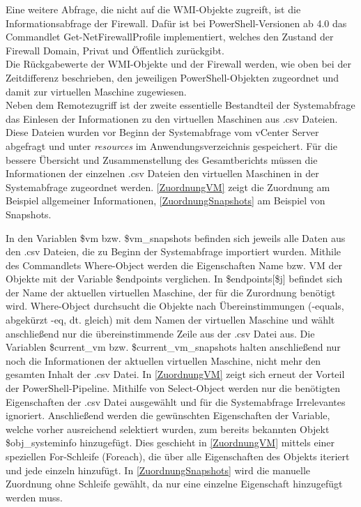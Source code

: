 Eine weitere Abfrage, die nicht auf die WMI-Objekte zugreift, ist die Informationsabfrage der Firewall. Dafür ist bei PowerShell-Versionen ab 4.0 das Commandlet Get-NetFirewallProfile implementiert, welches den Zustand der Firewall Domain, Privat und Öffentlich zurückgibt.\medskip\\
Die Rückgabewerte der WMI-Objekte und der Firewall werden, wie oben bei der Zeitdifferenz beschrieben, den jeweiligen PowerShell-Objekten zugeordnet und damit zur virtuellen Maschine zugewiesen.\medskip\\
Neben dem Remotezugriff ist der zweite essentielle Bestandteil der Systemabfrage das Einlesen der Informationen zu den virtuellen Maschinen aus .csv Dateien. Diese Dateien wurden vor Beginn der Systemabfrage vom vCenter Server abgefragt und unter \textit{resources} im Anwendungsverzeichnis gespeichert. Für die bessere Übersicht und Zusammenstellung des Gesamtberichts müssen die Informationen der einzelnen .csv Dateien den virtuellen Maschinen in der Systemabfrage zugeordnet werden. \autoref{ZuordnungVM} zeigt die Zuordnung am Beispiel allgemeiner Informationen, \autoref{ZuordnungSnapshots} am Beispiel von Snapshots.


In den Variablen \$vm bzw. \$vm\_snapshots befinden sich jeweils alle Daten aus den .csv Dateien, die zu Beginn der Systemabfrage importiert wurden. Mithile des Commandlets Where-Object werden die Eigenschaften Name bzw. VM der Objekte mit der Variable \$endpoints verglichen. In \$endpoints[\$j] befindet sich der Name der aktuellen virtuellen Maschine, der für die Zurordnung benötigt wird. Where-Object durchsucht die Objekte nach Übereinstimmungen (-equals, abgekürzt -eq, dt. gleich) mit dem Namen der virtuellen Maschine und wählt anschließend nur die übereinstimmende Zeile aus der .csv Datei aus. Die Variablen \$current\_vm bzw. \$current\_vm\_snapshots halten anschließend nur noch die Informationen der aktuellen virtuellen Maschine, nicht mehr den gesamten Inhalt der .csv Datei. In \autoref{ZuordnungVM} zeigt sich erneut der Vorteil der PowerShell-Pipeline. Mithilfe von Select-Object werden nur die benötigten Eigenschaften der .csv Datei ausgewählt und für die Systemabfrage Irrelevantes ignoriert. Anschließend werden die gewünschten  Eigenschaften der Variable, welche vorher ausreichend selektiert wurden, zum bereits bekannten Objekt \$obj\_systeminfo hinzugefügt. Dies geschieht in \autoref{ZuordnungVM} mittels einer speziellen For-Schleife (Foreach), die über alle Eigenschaften des Objekts iteriert und jede einzeln hinzufügt. In \autoref{ZuordnungSnapshots} wird die manuelle Zuordnung ohne Schleife gewählt, da nur eine einzelne Eigenschaft hinzugefügt werden muss.\medskip\\
